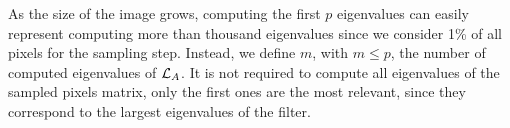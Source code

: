 As the size of the image grows, computing the first \(p\) eigenvalues can easily represent computing more than thousand eigenvalues since we consider 1\% of all pixels for the sampling step.
Instead, we define \(m\), with \(m \le p\), the number of computed eigenvalues of \(\operatorname{\mathcal{L}}_A\).
It is not required to compute all eigenvalues of the sampled pixels matrix, only the first ones are the most relevant, since they correspond to the largest eigenvalues of the filter.
